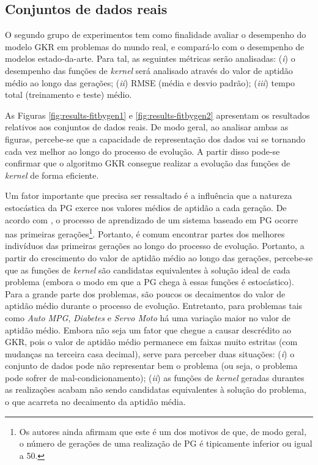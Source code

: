 \subsection{Conjuntos de dados reais}
O segundo grupo de experimentos tem como finalidade avaliar o desempenho do modelo GKR em problemas do mundo real, e compará-lo com o desempenho de modelos estado-da-arte. Para tal, as seguintes métricas serão analisadas: (\textit{i}) o desempenho das funções de \textit{kernel} será analisado através do valor de aptidão médio ao longo das gerações; (\textit{ii}) RMSE (média e desvio padrão); (\textit{iii}) tempo total (treinamento e teste) médio.

As Figuras \ref{fig:results-fitbygen1} e \ref{fig:results-fitbygen2} apresentam os resultados relativos aos conjuntos de dados reais. De modo geral, ao analisar ambas as figuras, percebe-se que a capacidade de representação dos dados vai se tornando cada vez melhor ao longo do processo de evolução. A partir disso pode-se confirmar que o algoritmo GKR consegue realizar a evolução das funções de \textit{kernel} de forma eficiente.

Um fator importante que precisa ser ressaltado é a influência que a natureza estocástica da PG exerce nos valores médios de aptidão a cada geração. De acordo com , o processo de aprendizado de um sistema baseado em PG ocorre nas primeiras gerações\footnote{Os autores ainda afirmam que este é um dos motivos de que, de modo geral, o número de gerações de uma realização de PG é tipicamente inferior ou igual a 50.}. Portanto, é comum encontrar partes dos melhores indivíduos das primeiras gerações ao longo do processo de evolução. Portanto, a partir do crescimento do valor de aptidão médio ao longo das gerações, percebe-se que as funções de \textit{kernel} são candidatas equivalentes à solução ideal de cada problema (embora o modo em que a PG chega à essas funções é estocástico). Para a grande parte dos problemas, são poucos os decaimentos do valor de aptidão médio durante o processo de evolução. Entretanto, para problemas tais como \textit{Auto MPG}, \textit{Diabetes} e \textit{Servo Moto} há uma variação maior no valor de aptidão médio. Embora não seja um fator que chegue a causar descrédito ao GKR, pois o valor de aptidão médio permanece em faixas muito estritas (com mudanças na terceira casa decimal), serve para perceber duas situações: (\textit{i}) o conjunto de dados pode não representar bem o problema (ou seja, o problema pode sofrer de mal-condicionamento); (\textit{ii}) as funções de \textit{kernel} geradas durantes as realizações acabam não sendo candidatas equivalentes à solução do problema, o que acarreta no decaimento da aptidão média.

